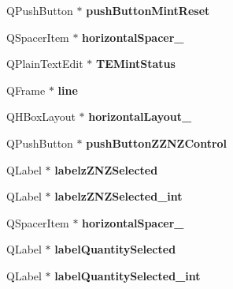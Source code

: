 \begin{DoxyCompactItemize}
Q\+Push\+Button $\ast$ {\bfseries push\+Button\+Mint\+Reset}
\item 
\mbox{\label{class_ui___privacy_dialog_a943aa5908a20c65f5c840c7b63078a7c}} 
Q\+Spacer\+Item $\ast$ {\bfseries horizontal\+Spacer\+\_}
\item 
\mbox{\label{class_ui___privacy_dialog_ad3a343450edcb5de839344fc7101a8f1}} 
Q\+Plain\+Text\+Edit $\ast$ {\bfseries T\+E\+Mint\+Status}
\item 
\mbox{\label{class_ui___privacy_dialog_adf3cb9625cf7e2e852038f10eb65e114}} 
Q\+Frame $\ast$ {\bfseries line}
\item 
\mbox{\label{class_ui___privacy_dialog_a18e42bd54efdfe3556f85262ed6710b8}} 
Q\+H\+Box\+Layout $\ast$ {\bfseries horizontal\+Layout\+\_}
\item 
\mbox{\label{class_ui___privacy_dialog_aa224a0c6d6c1b47d2bc866e408182dad}} 
Q\+Push\+Button $\ast$ {\bfseries push\+Button\+Z\+Z\+N\+Z\+Control}
\item 
\mbox{\label{class_ui___privacy_dialog_afb0680eeac7e6207dc7a8c17de8896ec}} 
Q\+Label $\ast$ {\bfseries labelz\+Z\+N\+Z\+Selected}
\item 
\mbox{\label{class_ui___privacy_dialog_a5a32c582c9d999b45870fa0a427f1173}} 
Q\+Label $\ast$ {\bfseries labelz\+Z\+N\+Z\+Selected\+\_\+int}
\item 
\mbox{\label{class_ui___privacy_dialog_a8d7d903c6c6f4e62d76246b95c2b608c}} 
Q\+Spacer\+Item $\ast$ {\bfseries horizontal\+Spacer\+\_}
\item 
\mbox{\label{class_ui___privacy_dialog_a795ae9283ada2434b3ad36b319e3395d}} 
Q\+Label $\ast$ {\bfseries label\+Quantity\+Selected}
\item 
\mbox{\label{class_ui___privacy_dialog_a7487041dec017136cee738a67bc1bdaa}} 
Q\+Label $\ast$ {\bfseries label\+Quantity\+Selected\+\_\+int}

\end{DoxyCompactItemize}
